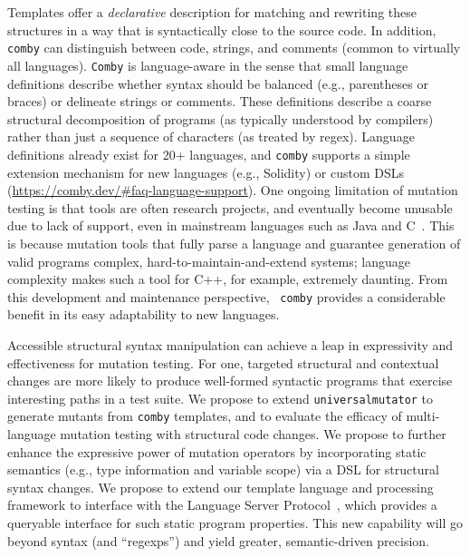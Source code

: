  Templates offer a \emph{declarative} description for matching and rewriting these structures in a way that is syntactically close to the source code.
In addition, {\tt comby} can distinguish between code, strings, and comments
(common to virtually all languages).
{\tt Comby} is language-aware in the sense that small language
definitions describe whether syntax should be balanced (e.g.,
parentheses or braces) or delineate strings or comments. These
definitions describe a coarse structural decomposition of programs (as
typically understood by compilers) rather than just a sequence of
characters (as treated by regex). Language definitions already exist
for 20+ languages, and {\tt comby} supports a simple extension
mechanism for new languages (e.g., Solidity) or custom DSLs (\url{https://comby.dev/\#faq-language-support}).
One ongoing limitation of mutation testing is that tools are often research
projects, and eventually become unusable due to lack of support, even in
mainstream languages such as Java and C~\cite{MutChoice}.
This is because mutation tools that fully parse a language and guarantee generation of
valid programs complex, hard-to-maintain-and-extend
systems; language complexity makes such a tool for C++, for example, 
extremely daunting. From this development and maintenance perspective, {\tt
  comby} provides a considerable benefit in its easy adaptability to new languages. 

Accessible structural syntax manipulation can achieve a leap in
expressivity and effectiveness for mutation testing. %
For one, targeted structural and contextual changes are
more likely to produce well-formed syntactic programs
that exercise interesting paths in a test suite.
We propose to extend {\tt universalmutator}
to generate mutants from {\tt comby} templates, and to evaluate the efficacy of
multi-language mutation testing with structural code changes.  We propose to
further enhance the expressive power of mutation operators by 
incorporating static semantics (e.g., type information and variable scope) via a
DSL for structural syntax changes. 
We propose to extend our template language and processing framework to interface
with the Language Server Protocol~\cite{lsp-web}, which
provides a queryable interface for such static program properties.
This new capability will go beyond syntax (and ``regexps'') and yield greater, semantic-driven precision.

